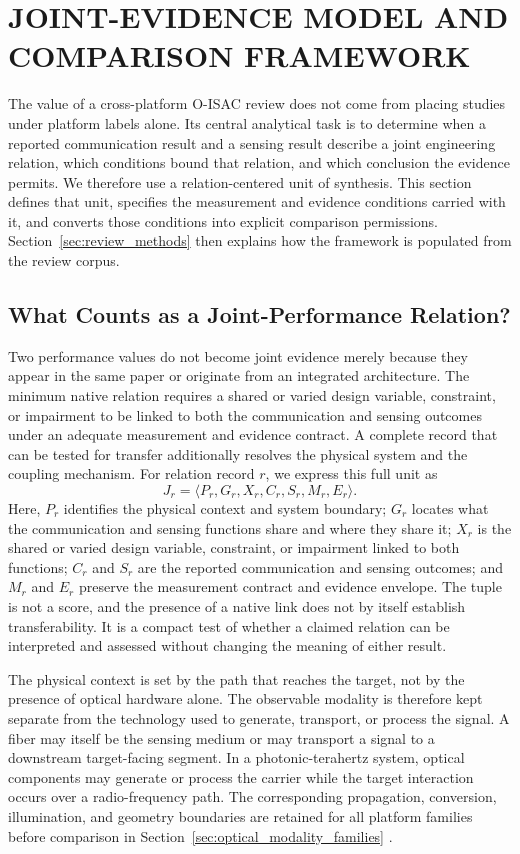\section{JOINT-EVIDENCE MODEL AND COMPARISON FRAMEWORK}
\label{sec:foundations_comparison}
The value of a cross-platform O-ISAC review does not come from placing studies
under platform labels alone. Its central analytical task is to determine when
a reported communication result and a sensing result describe a joint
engineering relation, which conditions bound that relation, and which
conclusion the evidence permits. We therefore use a relation-centered unit of
synthesis. This section defines that unit, specifies the measurement and
evidence conditions carried with it, and converts those conditions into
explicit comparison permissions. Section~\ref{sec:review_methods} then explains
how the framework is populated from the review corpus.

\subsection{What Counts as a Joint-Performance Relation?}

Two performance values do not become joint evidence merely because they
appear in the same paper or originate from an integrated architecture. The
minimum native relation requires a shared or varied design variable,
constraint, or impairment to be linked to both the communication and sensing
outcomes under an adequate measurement and evidence contract. A complete
record that can be tested for transfer additionally resolves the physical
system and the coupling mechanism. For relation record $r$, we express this
full unit as
\[
J_r=\langle P_r,G_r,X_r,C_r,S_r,M_r,E_r\rangle .
\]
Here, $P_r$ identifies the physical context and system boundary; $G_r$
locates what the communication and sensing functions share and where they
share it; $X_r$ is the shared or varied design variable, constraint, or
impairment linked to both functions; $C_r$ and $S_r$ are the reported
communication and sensing outcomes; and $M_r$ and $E_r$ preserve the
measurement contract and evidence envelope. The tuple is not a score, and the
presence of a native link does not by itself establish transferability. It is a
compact test of whether a claimed relation can be interpreted and assessed
without changing the meaning of either result.

The physical context is set by the path that reaches the target, not by the
presence of optical hardware alone. The observable modality is therefore kept
separate from the technology used to generate, transport, or process the
signal. A fiber may itself be the sensing medium or may transport a signal to
a downstream target-facing segment. In a photonic-terahertz system, optical
components may generate or process the carrier while the target interaction
occurs over a radio-frequency path. The corresponding propagation, conversion,
illumination, and geometry boundaries are retained for all platform families
before comparison in Section~\ref{sec:optical_modality_families}
\cite{OISAC_SCR00220,OISAC_SCR00940,OISAC_SCR00196,OISAC_SCR00083,
OISAC_SCR00366}.

